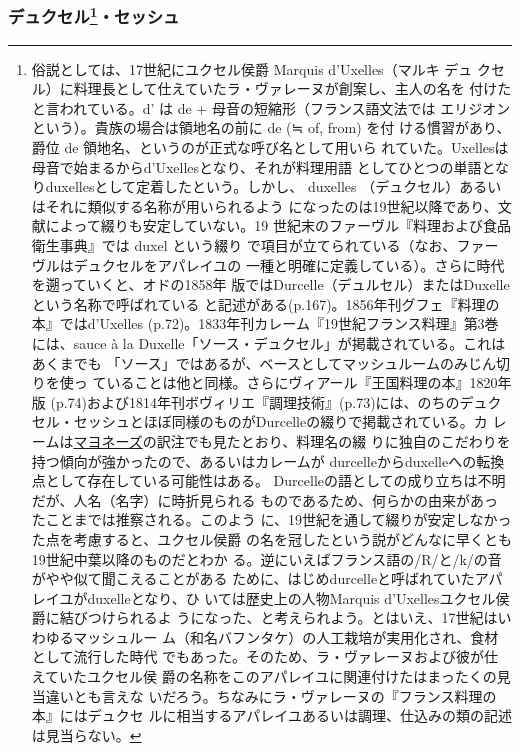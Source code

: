 \begin{recette}
{\subsubsection[デュクセル・セッシュ]{\texorpdfstring{デュクセル\footnote{俗説としては、17世紀にユクセル侯爵
  Marquis d'Uxelles（マルキ デュ
  クセル）に料理長として仕えていたラ・ヴァレーヌが創案し、主人の名を
  付けたと言われている。d' は de + 母音の短縮形（フランス語文法では
  エリジオンという）。貴族の場合は領地名の前に de (≒ of, from) を付
  ける慣習があり、爵位 de 領地名、というのが正式な呼び名として用いら
  れていた。Uxellesは母音で始まるからd'Uxellesとなり、それが料理用語
  としてひとつの単語となりduxellesとして定着したという。しかし、
  duxelles （デュクセル）あるいはそれに類似する名称が用いられるよう
  になったのは19世紀以降であり、文献によって綴りも安定していない。19
  世紀末のファーヴル『料理および食品衛生事典』では duxel という綴り
  で項目が立てられている（なお、ファーヴルはデュクセルをアパレイユの
  一種と明確に定義している）。さらに時代を遡っていくと、オドの1858年
  版ではDurcelle（デュルセル）またはDuxelleという名称で呼ばれている
  と記述がある(p.167)。1856年刊グフェ『料理の本』ではd'Uxelles
  (p.72)。1833年刊カレーム『19世紀フランス料理』第3巻には、sauce à la
  Duxelle「ソース・デュクセル」が掲載されている。これはあくまでも
  「ソース」ではあるが、ベースとしてマッシュルームのみじん切りを使っ
  ていることは他と同様。さらにヴィアール『王国料理の本』1820年版
  (p.74)および1814年刊ボヴィリエ『調理技術』(p.73)には、のちのデュク
  セル・セッシュとほぼ同様のものがDurcelleの綴りで掲載されている。カ
  レームは\protect\hyperlink{mayonnaise}{マヨネーズ}の訳注でも見たとおり、料理名の綴
  りに独自のこだわりを持つ傾向が強かったので、あるいはカレームが
  durcelleからduxelleへの転換点として存在している可能性はある。
  Durcelleの語としての成り立ちは不明だが、人名（名字）に時折見られる
  ものであるため、何らかの由来があったことまでは推察される。このよう
  に、19世紀を通して綴りが安定しなかった点を考慮すると、ユクセル侯爵
  の名を冠したという説がどんなに早くとも19世紀中葉以降のものだとわか
  る。逆にいえばフランス語の/R/と/k/の音がやや似て聞こえることがある
  ために、はじめdurcelleと呼ばれていたアパレイユがduxelleとなり、ひ
  いては歴史上の人物Marquis d'Uxellesユクセル侯爵に結びつけられるよ
  うになった、と考えられよう。とはいえ、17世紀はいわゆるマッシュルー
  ム（和名バフンタケ）の人工栽培が実用化され、食材として流行した時代
  でもあった。そのため、ラ・ヴァレーヌおよび彼が仕えていたユクセル侯
  爵の名称をこのアパレイユに関連付けたはまったくの見当違いとも言えな
  いだろう。ちなみにラ・ヴァレーヌの『フランス料理の本』にはデュクセ
  ルに相当するアパレイユあるいは調理、仕込みの類の記述は見当らない。}・セッシュ}{デュクセル・セッシュ}}\label{duxelles-seche}}


\end{recette}
